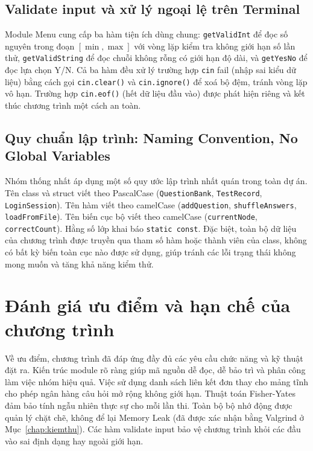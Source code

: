 \documentclass[11pt]{report}
\begin{document}
\subsection{Validate input và xử lý ngoại lệ trên Terminal}

Module Menu cung cấp ba hàm tiện ích dùng chung: \texttt{getValidInt} để đọc số nguyên trong đoạn $[\min, \max]$ với vòng lặp kiểm tra không giới hạn số lần thử, \texttt{getValidString} để đọc chuỗi không rỗng có giới hạn độ dài, và \texttt{getYesNo} để đọc lựa chọn Y/N. Cả ba hàm đều xử lý trường hợp \texttt{cin} fail (nhập sai kiểu dữ liệu) bằng cách gọi \texttt{cin.clear()} và \texttt{cin.ignore()} để xoá bộ đệm, tránh vòng lặp vô hạn. Trường hợp \texttt{cin.eof()} (hết dữ liệu đầu vào) được phát hiện riêng và kết thúc chương trình một cách an toàn.

\subsection{Quy chuẩn lập trình: Naming Convention, No Global Variables}

Nhóm thống nhất áp dụng một số quy ước lập trình nhất quán trong toàn dự án. Tên class và struct viết theo PascalCase (\texttt{QuestionBank}, \texttt{TestRecord}, \texttt{LoginSession}). Tên hàm viết theo camelCase (\texttt{addQuestion}, \texttt{shuffleAnswers}, \texttt{loadFromFile}). Tên biến cục bộ viết theo camelCase (\texttt{currentNode}, \texttt{correctCount}). Hằng số lớp khai báo \texttt{static const}. Đặc biệt, toàn bộ dữ liệu của chương trình được truyền qua tham số hàm hoặc thành viên của class, không có bất kỳ biến toàn cục nào được sử dụng, giúp tránh các lỗi trạng thái không mong muốn và tăng khả năng kiểm thử.

\section{Đánh giá ưu điểm và hạn chế của chương trình}

Về ưu điểm, chương trình đã đáp ứng đầy đủ các yêu cầu chức năng và kỹ thuật đặt ra. Kiến trúc module rõ ràng giúp mã nguồn dễ đọc, dễ bảo trì và phân công làm việc nhóm hiệu quả. Việc sử dụng danh sách liên kết đơn thay cho mảng tĩnh cho phép ngân hàng câu hỏi mở rộng không giới hạn. Thuật toán Fisher-Yates đảm bảo tính ngẫu nhiên thực sự cho mỗi lần thi. Toàn bộ bộ nhớ động được quản lý chặt chẽ, không để lại Memory Leak (đã được xác nhận bằng Valgrind ở Mục~\ref{chap:kiemthu}). Các hàm validate input bảo vệ chương trình khỏi các đầu vào sai định dạng hay ngoài giới hạn.
\end{document}
